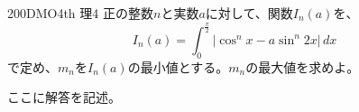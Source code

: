 \begin{prob}{200}{\maru}{DMO4th 理4}
 正の整数$n$と実数$a$に対して、関数$I_n(a)$を、
 \[ I_n(a)=\int_0^{\frac{\pi}{2}}\! \left|\cos^n x-a\sin^n2x\right| \,dx \]
 で定め、$m_n$を$I_n(a)$の最小値とする。$m_n$の最大値を求めよ。
\end{prob}
ここに解答を記述。